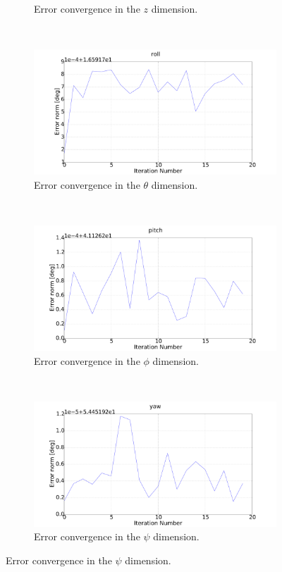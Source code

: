 \begin{figure}
\begin{subfigure}{0.45\textwidth}
    \caption{Error convergence in the $z$ dimension.}
\label{fig:err-convergence-z}
  \end{subfigure}
~
  \begin{subfigure}{0.45\textwidth}
    \includegraphics[width=\textwidth]{figures/chapter3/err_roll}
    \caption{Error convergence in the $\theta$ dimension.}
\label{fig:err-convergence-roll}
  \end{subfigure}
~
  \begin{subfigure}{0.45\textwidth}
    \includegraphics[width=\textwidth]{figures/chapter3/err_pitch}
    \caption{Error convergence in the $\phi$ dimension.}
\label{fig:err-convergence-pitch}
  \end{subfigure}
~
  \begin{subfigure}{0.45\textwidth}
    \includegraphics[width=\textwidth]{figures/chapter3/err_yaw}
    \caption{Error convergence in the $\psi$ dimension.}
\label{fig:err-convergence-psi}
  \end{subfigure}
\end{figure}


